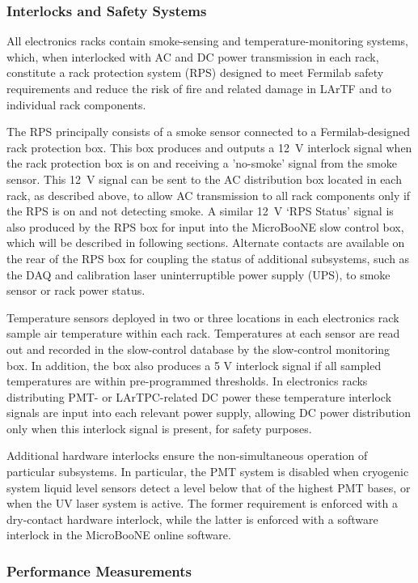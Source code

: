\subsubsection{Interlocks and Safety Systems}
All electronics racks contain smoke-sensing and temperature-monitoring systems, which, when interlocked with AC and DC power transmission in each rack, constitute a rack protection system (RPS) designed to meet Fermilab safety requirements and reduce the risk of fire and related damage in LArTF and to individual rack components.

The RPS principally consists of a smoke sensor connected to a Fermilab-designed rack protection box.  This box produces and outputs a 12~V interlock signal when the rack protection box is on and receiving a 'no-smoke' signal from the smoke sensor.  This 12~V signal can be sent to the AC distribution box located in each rack, as described above, to allow AC transmission to all rack components only if the RPS is on and not detecting smoke.  A similar 12~V `RPS Status' signal is also produced by the RPS box for input into the MicroBooNE slow control box, which will be described in following sections.  Alternate contacts are available on the rear of the RPS box for coupling the status of additional subsystems, such as the DAQ and calibration laser uninterruptible power supply (UPS), to smoke sensor or rack power status.

Temperature sensors deployed in two or three locations in each electronics rack sample air temperature within each rack.  Temperatures at each sensor are read out and recorded in the slow-control database by the slow-control monitoring box.  In addition, the box also produces a 5 V interlock signal if all sampled temperatures are within pre-programmed thresholds.  In electronics racks distributing PMT- or LArTPC-related DC power these temperature interlock signals are input into each relevant power supply, allowing DC power distribution only when this interlock signal is present, for safety purposes.

Additional hardware interlocks ensure the non-simultaneous operation of particular subsystems.  In particular, the PMT system is disabled when cryogenic system liquid level sensors detect a level below that of the highest PMT bases, or when the UV laser system is active.  The former requirement is enforced with a dry-contact hardware interlock, while the latter is enforced with a software interlock in the MicroBooNE online software.

\subsubsection{Performance Measurements}

